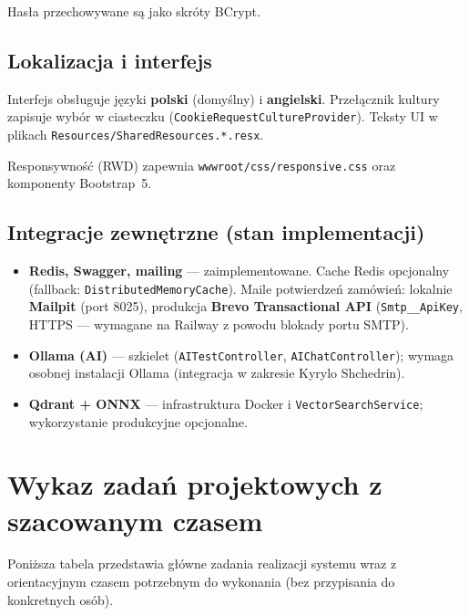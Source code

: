 \documentclass[12pt,a4paper]{article}
\begin{document}
Hasła przechowywane są jako skróty BCrypt.

\subsection{Lokalizacja i interfejs}

Interfejs obsługuje języki \textbf{polski} (domyślny) i \textbf{angielski}.
Przełącznik kultury zapisuje wybór w ciasteczku (\texttt{CookieRequestCultureProvider}).
Teksty UI w plikach \texttt{Resources/SharedResources.*.resx}.

Responsywność (RWD) zapewnia \texttt{wwwroot/css/responsive.css} oraz komponenty Bootstrap~5.

\subsection{Integracje zewnętrzne (stan implementacji)}

\begin{itemize}
    \item \textbf{Redis, Swagger, mailing} --- zaimplementowane. Cache Redis opcjonalny
          (fallback: \texttt{DistributedMemoryCache}). Maile potwierdzeń zamówień:
          lokalnie \textbf{Mailpit} (port 8025), produkcja \textbf{Brevo Transactional API}
          (\texttt{Smtp\_\_ApiKey}, HTTPS --- wymagane na Railway z powodu blokady portu SMTP).
    \item \textbf{Ollama (AI)} --- szkielet (\texttt{AITestController}, \texttt{AIChatController});
          wymaga osobnej instalacji Ollama (integracja w zakresie Kyrylo Shchedrin).
    \item \textbf{Qdrant + ONNX} --- infrastruktura Docker i \texttt{VectorSearchService};
          wykorzystanie produkcyjne opcjonalne.
\end{itemize}

\section{Wykaz zadań projektowych z szacowanym czasem}

Poniższa tabela przedstawia główne zadania realizacji systemu wraz z orientacyjnym
czasem potrzebnym do wykonania (bez przypisania do konkretnych osób).
\end{document}
